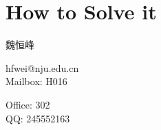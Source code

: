 \section{How to Solve it}

\begin{frame}
  \begin{center}
    魏恒峰

    hfwei@nju.edu.cn \\[10pt]

    Mailbox: H016

    Office: 302  \\[10pt]

    QQ: 245552163
  \end{center}
\end{frame}
